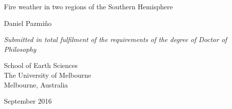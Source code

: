 
\begin{center}
\vspace*{1.5cm}

\par\end{center}

\begin{center}
{\huge{}Fire weather in two regions of the Southern Hemisphere}
\par\end{center}{\huge \par}

\vspace{2cm}


\begin{center}
{\Large{}Daniel Pazmi\~no}
\par\end{center}{\Large \par}

\vspace*{2cm}


\begin{center}
\textsl{\large{}Submitted in total fulfilment of the requirements
of the degree of Doctor of Philosophy}
\par\end{center}{\large \par}

\vspace*{2cm}


\begin{center}
{\large{}School of Earth Sciences}\\
{\large{}The University of Melbourne}\\
{\large{}Melbourne, Australia}
\par\end{center}{\large \par}

{\large{}\vspace{2cm}
}{\large \par}

\begin{center}
{\large{}September 2016}
\par\end{center}{\large \par}
